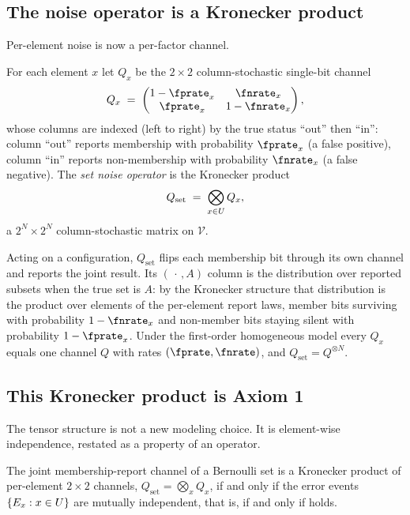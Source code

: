 \subsection*{The noise operator is a Kronecker product}

Per-element noise is now a per-factor channel.

\begin{definition}
\label{def:set-noise-operator}
For each element $x$ let $Q_x$ be the $2 \times 2$ column-stochastic single-bit
channel
\[
  Q_x \;=\;
  \begin{pmatrix}
    1 - \fprate_x & \fnrate_x \\
    \fprate_x & 1 - \fnrate_x
  \end{pmatrix},
\]
whose columns are indexed (left to right) by the true status ``out'' then
``in'': column ``out'' reports membership with probability $\fprate_x$ (a false
positive), column ``in'' reports non-membership with probability $\fnrate_x$ (a
false negative). The \emph{set noise operator} is the Kronecker product
\[
  Q_{\mathrm{set}} \;=\; \bigotimes_{x \in U} Q_x,
\]
a $2^{N} \times 2^{N}$ column-stochastic matrix on $\mathcal{V}$.
\end{definition}

Acting on a configuration, $Q_{\mathrm{set}}$ flips each membership bit through
its own channel and reports the joint result. Its $(\,\cdot\,, A)$ column is the
distribution over reported subsets when the true set is $A$: by the Kronecker
structure that distribution is the product over elements of the per-element
report laws, member bits surviving with probability $1 - \fnrate_x$ and
non-member bits staying silent with probability $1 - \fprate_x$. Under the
first-order homogeneous model every $Q_x$ equals one channel $Q$ with rates
$(\fprate, \fnrate)$, and $Q_{\mathrm{set}} = Q^{\otimes N}$.

\subsection*{This Kronecker product is Axiom 1}

The tensor structure is not a new modeling choice. It is element-wise
independence, restated as a property of an operator.

\begin{proposition}
\label{prop:set-operator-is-axiom-1}
The joint membership-report channel of a Bernoulli set is a Kronecker product of
per-element $2 \times 2$ channels, $Q_{\mathrm{set}} = \bigotimes_{x} Q_x$, if
and only if the error events $\{E_x : x \in U\}$ are mutually
independent, that is, if and only if  holds.
\end{proposition}

